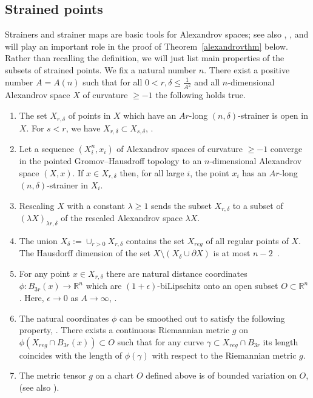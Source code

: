 \documentclass[12pt,leqno,intlimits]{amsart}
\numberwithin{equation}{section}
\theoremstyle{definition}
\theoremstyle{remark}
\newcommand{\tref}[1]{Theorem~\ref{#1}}
\newcommand{\R}{\mathbb{R}}
\def\:{\colon}
\begin{document}
\subsection{Strained points}  \label{subsec:strainer}
  Strainers and strainer maps are basic tools for Alexandrov spaces; see also \cite{BGP},  \cite{Otsu-Shioya}, \cite{Shioya} and will play an important role in the proof of \tref{alexandrovthm} below. Rather than recalling the definition, we will just list main properties of the subsets of strained points.  We fix a natural number $n$.
There exist a positive number $A=A(n)$ such that for   all $0<r,\delta \leq  \frac 1 {A^2}$ and all $n$-dimensional Alexandrov space $X$ of curvature $\geq -1$ the following holds true.
\begin{enumerate}

\item The set $X_{r,\delta}$ of points in $X$ which have an $Ar$-long $(n,\delta)$-strainer is   open in $X$.  For $s<r$, we have $X_{r,\delta} \subset X_{s,\delta}$,  \cite[9.7]{BGP}.

\item Let a sequence    $(X_i ^n,x_i)$ of Alexandrov spaces  of curvature $\geq -1$ converge in the pointed Gromov--Hausdroff topology to an $n$-dimensional Alexandrov space $(X,x)$.
If $x\in X_{r,\delta}$ then, for all large $i$, the point $x_i$ has an $Ar$-long  $(n, \delta)$-strainer in $X_i$.

 \item Rescaling $X$ with a constant $\lambda \geq 1$ sends the subset $X_{r,\delta}$ to a subset of $(\lambda X )_{\lambda r, \delta} $ of the rescaled Alexandrov space $\lambda X$.

\item The union $X_{\delta}:= \cup _{r>0}  X_{r,\delta}$ contains the set $X_{reg}$ of all regular points of $X$. The Hausdorff dimension of the set $X\setminus (X_{\delta} \cup \partial X)$ is at most $n-2$~\cite[10.6, 10.6.1, 12.8]{BGP}.

\item    For any point $x\in X_{r,\delta}$ there are natural distance coordinates $\phi\: B_{3r} (x) \to \R^n$ which are $(1+\epsilon)$-biLipschitz onto an open subset $O \subset \R^n$.  Here, $\epsilon\to 0$ as $A\to\infty$, \cite[9.4]{BGP}.

\item The natural coordinates $\phi$ can be smoothed out to satisfy the following property, \cite[Theorem B]{Otsu-Shioya}.  There exists a continuous Riemannian metric  $g$ on $\phi (X_{reg} \cap B_{3r} (x)) \subset O$  such  that for any curve $\gamma \subset X_{reg} \cap B_{3r} $ its length
  coincides with  the length of $\phi (\gamma )$  with respect to the Riemannian metric $g$.

\item  The metric tensor $g$ on a chart $O$ defined above is of bounded variation on $O$, \cite[4.2]{Per-DC} (see also \cite{AB15}).
    \end{enumerate}
\end{document}
